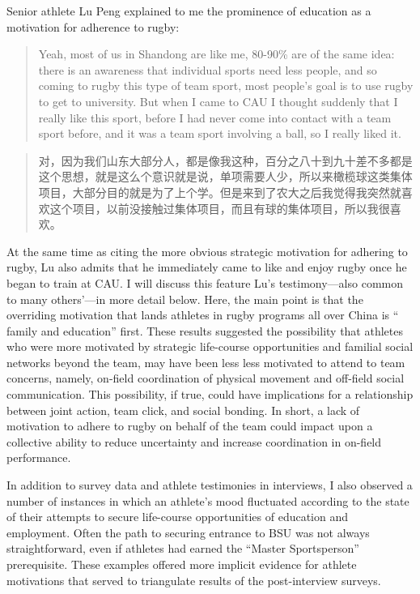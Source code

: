 \begin{CJK}{UTF8}{gbsn}
Senior athlete Lu Peng explained to me the prominence of education as a motivation for adherence to rugby:
      \begin{quote}
          Yeah, most of us in Shandong are like me, 80-90\% are of the same idea: there is an awareness that individual sports need less people, and so coming to rugby this type of team sport, most people's goal is to use rugby to get to university.  But when I came to CAU I thought suddenly that I really like this sport, before I had never come into contact with a team sport before, and it was a team sport involving a ball, so I really liked it.
      \end{quote}
      \begin{quote}
           对，因为我们山东大部分人，都是像我这种，百分之八十到九十差不多都是这个思想，就是这么个意识就是说，单项需要人少，所以来橄榄球这类集体项目，大部分目的就是为了上个学。但是来到了农大之后我觉得我突然就喜欢这个项目，以前没接触过集体项目，而且有球的集体项目，所以我很喜欢。
      \end{quote}
At the same time as citing the more obvious strategic motivation for adhering to rugby, Lu also admits that he immediately came to like and enjoy rugby once he began to train at CAU. I will discuss this feature Lu's testimony—also common to many others'---in more detail below.  Here, the main point is that the overriding motivation that lands athletes in rugby programs all over China is `` family and education'' first.
These results suggested the possibility that athletes who were more motivated by strategic life-course opportunities and familial social networks beyond the team, may have been less less motivated to attend to team concerns, namely, on-field coordination of physical movement and off-field social communication.  This possibility, if true, could have implications for a relationship between joint action, team click, and social bonding. In short, a lack of motivation to adhere to rugby on behalf of the team could impact upon a collective ability to reduce uncertainty and increase coordination in on-field performance.

In addition to survey data and athlete testimonies in interviews, I also observed a number of instances in which an athlete's mood fluctuated according to the state of their attempts to secure life-course opportunities of education and employment.  Often the path to securing entrance to BSU was not always straightforward, even if athletes had earned the ``Master Sportsperson'' prerequisite. These examples offered more implicit evidence for athlete motivations that served to triangulate results of the post-interview surveys.


\end{CJK}

